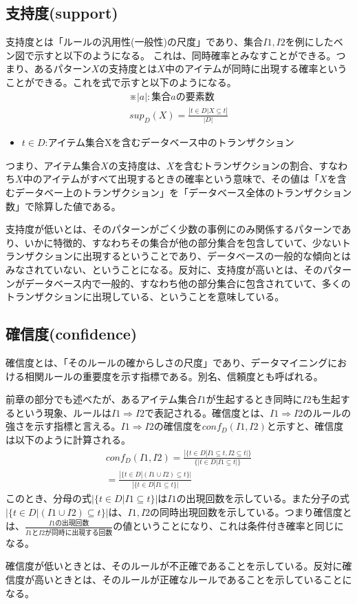 \documentclass[dvipdfmx]{jsarticle}
\begin{document}
\subsection{支持度(support)}
支持度とは「ルールの汎用性(一般性)の尺度」であり、集合$I1, I2$を例にしたベン図で示すと以下のようになる。
これは、同時確率とみなすことができる。つまり、あるパターン$X$の支持度とは$X$中のアイテムが同時に出現する確率ということができる。これを式で示すと以下のようになる。
\begin{gather*}
  ※|a|:集合aの要素数\\
  sup_{D}(X) = \frac{|{t\in D|X\subseteq t}|}{|D|}
\end{gather*}
\begin{itemize}
  \item $t \in D$:アイテム集合Xを含むデータベース中のトランザクション
\end{itemize}
つまり、アイテム集合$X$の支持度は、$X$を含むトランザクションの割合、すなわち$X$中のアイテムがすべて出現するときの確率という意味で、その値は「$X$を含むデータベー上のトランザクション」を「データベース全体のトランザクション数」で除算した値である。\par
支持度が低いとは、そのパターンがごく少数の事例にのみ関係するパターンであり、いかに特徴的、すなわちその集合が他の部分集合を包含していて、少ないトランザクションに出現するということであり、データベースの一般的な傾向とはみなされていない、ということになる。反対に、支持度が高いとは、そのパターンがデータベース内で一般的、すなわち他の部分集合に包含されていて、多くのトランザクションに出現している、ということを意味している。
\subsection{確信度(confidence)}
確信度とは、「そのルールの確からしさの尺度」であり、データマイニングにおける相関ルールの重要度を示す指標である。別名、信頼度とも呼ばれる。\par
前章の部分でも述べたが、あるアイテム集合$I1$が生起するとき同時に$I2$も生起するという現象、ルールは$I1 \Rightarrow I2$で表記される。確信度とは、$I1 \Rightarrow I2$のルールの強さを示す指標と言える。$I1 \Rightarrow I2$の確信度を$conf_{D}(I1, I2)$と示すと、確信度は以下のように計算される。
\begin{gather*}
  conf_{D}(I1, I2) = \frac{|\{t \in D|I1 \subseteq t, I2 \subseteq t|\}}{\{|t \in D | I1 \subseteq t|\}}\\
  =\frac{|\{t \in D | (I1 \cup I2) \subseteq t\}|}{|\{t \in D | I1 \subseteq t\}|}
\end{gather*}
このとき、分母の式$|\{t \in D | I1 \subseteq t\}|$は$I1$の出現回数を示している。また分子の式$|\{t \in D | (I1 \cup I2) \subseteq t\}|$は、$I1, I2$の同時出現回数を示している。つまり確信度とは、$\frac{I1の出現回数}{I1とI2が同時に出現する回数}$の値ということになり、これは条件付き確率と同じになる。\par
確信度が低いときとは、そのルールが不正確であることを示している。反対に確信度が高いときとは、そのルールが正確なルールであることを示していることになる。
\end{document}
